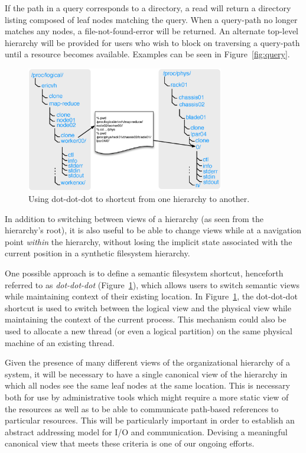 \documentclass{sig-alternate}
\begin{document}
If the path in a query corresponds to a directory, a read will
return a directory listing composed of leaf nodes matching the query.  When
a query-path no longer matches any nodes, a file-not-found-error will be returned.
An alternate top-level hierarchy will be provided for users who wish to block
on traversing a query-path until a resource becomes available.  Examples
can be seen in Figure~\ref{fig:query}.

\begin{figure}
\begin{center}
\includegraphics[width=3.4in, keepaspectratio]{ILLUSTRATIONS/org2-dotdotdot.eps}
\end{center}
\vspace{-0.1in}
\caption{Using dot-dot-dot to shortcut from one hierarchy to another.}
\label{fig:dot-dot-dot}
\end{figure}


In addition to switching between views of a hierarchy (as seen from the hierarchy's root), it
is also useful to be able to change views while at a navigation point
{\it within} the hierarchy, without losing the implicit state associated
with the current position in a synthetic filesystem hierarchy.

One possible approach is to define a semantic filesystem shortcut, henceforth
referred to as {\it dot-dot-dot} (Figure~\ref{fig:dot-dot-dot}), 
which allows users to switch semantic views while maintaining context of 
their existing location.  In Figure~\ref{fig:dot-dot-dot}, the dot-dot-dot shortcut is used to switch between
the logical view and the physical view while maintaining the context of the 
current process.  This mechanism could also be used to allocate a new thread (or even a
logical partition) on the same physical machine of an existing thread.

Given the presence of many different views of the organizational hierarchy of
a system,
it will be necessary to have a single canonical view of the hierarchy in which
all nodes see the same leaf nodes at the same location.
This is necessary both for use by administrative tools which might require
a more static view of the resources as well as to be able to communicate
path-based references to particular resources.  This will be particularly
important in order to establish an abstract addressing model for I/O and
communication.  Devising a meaningful canonical view that meets these
criteria is one of our ongoing efforts.
\end{document}

